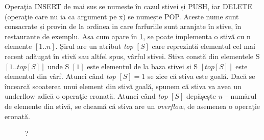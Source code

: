 Operaţia INSERT de mai sus se numește în cazul stivei și PUSH, iar DELETE (operaţie care nu ia ca argument pe x) se numește POP. Aceste nume sunt consacrate și provin de la ordinea in care farfuriile sunt aranjate în stive, în restaurante de exemplu.
Așa cum apare în \ref{fig:structuriDate1}, se poate implementa o stivă cu n elemente $\left [ 1..n \right ]$. Șirul are un atribut \textit{top} $\left [ S \right ] $ care reprezintă elementul cel mai recent adăugat în stivă sau altfel spus, vârful stivei.
Stiva constă din elementele S $\left [ 1..\textit{top} \left [ S \right ] \right ]$ unde S $\left [ 1 \right ]$ este elementul de la baza stivei și S $\left [ \textit{top} \left [ S \right ] \right ]$ este elementul din vârf.
Atunci când \textit{top} $\left [ S \right ] = 1$ se zice că stiva este goală. Dacă se încearcă scoaterea unui element din stivă goală, spunem că stiva va avea un underflow adică o operaţie eronată.
Atunci când \textit{top} $\left [ S \right ]$ depășește \textit{n} – numărul de elemente din stivă, se cheamă că stiva are un \textit{overflow}, de asemenea o operaţie eronată.

\begin{figure}[ht] %
	\centering	
		\caption{?} 
		\label{fig:structuriDate1}
	\end{figure}


